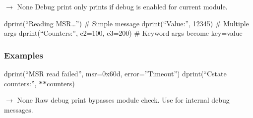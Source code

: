 \documentclass[letterpaper,10pt,english]{sphinxmanual}
\begin{document}

\begin{fulllineitems}
\label{\detokenize{core.utils.debug:core.utils.debug.dprint}}
\pysigstartsignatures
\pysiglinewithargsret
{}
{\sphinxparamcomma {}}
{{ $\rightarrow$ None}}
\pysigstopsignatures
\sphinxAtStartPar
Debug print \textendash{} only prints if debug is enabled for current module.
\begin{description}
\sphinxAtStartPar
dprint(“Reading MSR…”)  \# Simple message
dprint(“Value:”, 12345)   \# Multiple args
dprint(“Counters:”, c2=100, c3=200)  \# Keyword args become key=value

\end{description}
\subsubsection*{Examples}

\sphinxAtStartPar
dprint(“MSR read failed”, msr=0x60d, error=”Timeout”)
dprint(“C\sphinxhyphen{}state counters:”, {\color{red}\bfseries{}**}counters)

\end{fulllineitems}


\begin{fulllineitems}
\label{\detokenize{core.utils.debug:core.utils.debug.dprint_raw}}
\pysigstartsignatures
\pysiglinewithargsret
{}
{\sphinxparamcomma {}\sphinxparamcomma {}}
{{ $\rightarrow$ None}}
\pysigstopsignatures
\sphinxAtStartPar
Raw debug print \textendash{} bypasses module check. Use for internal debug messages.

\end{fulllineitems}

\end{document}

